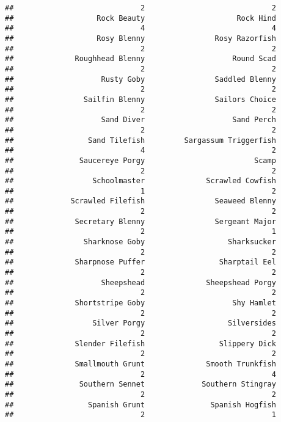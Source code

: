 \documentclass[
]{article}
\begin{document}
\begin{verbatim}
##                             2                             2 
##                   Rock Beauty                     Rock Hind 
##                             4                             4 
##                   Rosy Blenny                Rosy Razorfish 
##                             2                             2 
##              Roughhead Blenny                    Round Scad 
##                             2                             2 
##                    Rusty Goby                Saddled Blenny 
##                             2                             2 
##                Sailfin Blenny                Sailors Choice 
##                             2                             2 
##                    Sand Diver                    Sand Perch 
##                             2                             2 
##                 Sand Tilefish         Sargassum Triggerfish 
##                             4                             2 
##               Saucereye Porgy                         Scamp 
##                             2                             2 
##                  Schoolmaster              Scrawled Cowfish 
##                             1                             2 
##             Scrawled Filefish                Seaweed Blenny 
##                             2                             2 
##              Secretary Blenny                Sergeant Major 
##                             2                             1 
##                Sharknose Goby                   Sharksucker 
##                             2                             2 
##              Sharpnose Puffer                 Sharptail Eel 
##                             2                             2 
##                    Sheepshead              Sheepshead Porgy 
##                             2                             2 
##              Shortstripe Goby                    Shy Hamlet 
##                             2                             2 
##                  Silver Porgy                   Silversides 
##                             2                             2 
##              Slender Filefish                 Slippery Dick 
##                             2                             2 
##              Smallmouth Grunt              Smooth Trunkfish 
##                             2                             4 
##               Southern Sennet             Southern Stingray 
##                             2                             2 
##                 Spanish Grunt               Spanish Hogfish 
##                             2                             1 

\end{verbatim}
\end{document}
